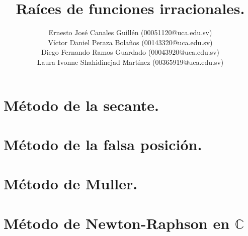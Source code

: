 \documentclass[9pt,journal]{IEEEtran}
\title{Raíces de funciones irracionales.}
\author{
    Ernesto José Canales Guillén (00051120@uca.edu.sv)\\
    Víctor Daniel Peraza Bolaños (00143320@uca.edu.sv)\\
    Diego Fernando Ramos Guardado (00043920@uca.edu.sv)\\
    Laura Ivonne Shahidinejad Martínez (00365919@uca.edu.sv)
}
\numberwithin{equation}{section}
\begin{document}
\maketitle
\tableofcontents
\section{Método de la secante.}

\section{Método de la falsa posición.}






\clearpage
\section{Método de Muller.}







\clearpage
\section{Método de Newton-Raphson en $\mathbb{C}$}








\setcounter{subsection}{0}



\end{document}

